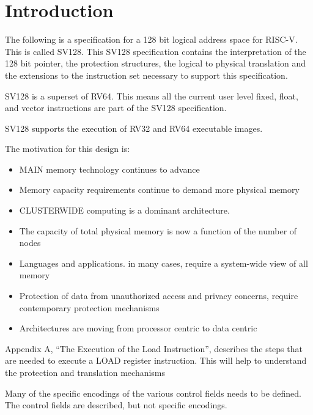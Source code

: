 \documentclass{article}
\begin{document}
\clearpage
\section{Introduction}
\label{sec:Introduction}

The following  is a specification for a 128 bit logical  address space for RISC-V.  This is called SV128.  This SV128 specification contains the   interpretation  of the 128 bit pointer,  the  protection structures, the logical to physical translation and the extensions to the instruction set necessary to support this specification.

SV128 is a superset of RV64.  This means all the current user level fixed, float, and vector instructions are part of the SV128 specification.

SV128 supports the execution of RV32 and RV64 executable images.

The motivation for this design is:

\begin{itemize}
\item  MAIN memory technology continues to advance
\item  Memory capacity requirements continue to  demand more physical memory
\item CLUSTER\-WIDE  computing is a dominant architecture. 
\item The capacity of total physical memory is now a function of the number of nodes
\item Languages and applications.  in many cases, require a system-wide view of all memory
\item Protection of data from unauthorized  access and privacy concerns, require  contemporary protection mechanisms
\item Architectures are moving from processor centric to data centric
\end{itemize}



Appendix A,  “The Execution of the Load Instruction”, describes the steps that are needed to execute a LOAD register instruction.  This will help to understand the protection and translation mechanisms

Many of the specific encodings of the various control fields needs to be defined.  The control fields are  described,  but not specific encodings.
\end{document}
